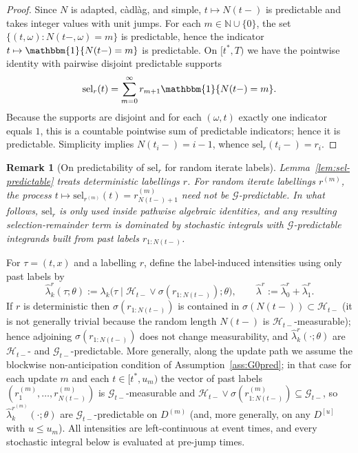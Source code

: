 \documentclass{statsoc}
\newtheorem{remark}[remark]{Remark}
\newcommand{\1}{\mathbbm{1}}
\newcommand{\bbN}{\mathbb{N}}
\begin{document}
\begin{proof}
Since $N$ is adapted, c\`adl\`ag, and simple, $t\mapsto N(t-)$ is predictable and takes integer values with unit jumps. For each $m\in\bbN\cup\{0\}$, the set $\{(t,\omega):N(t-,\omega)=m\}$ is predictable, hence the indicator $t\mapsto \1\{N(t-)=m\}$ is predictable. On $[t^\ast,T)$ we have the pointwise identity with pairwise disjoint predictable supports
\[
\mathrm{sel}_r(t)=\sum_{m=0}^\infty r_{m+1} \1\{N(t-)=m\}.
\]
Because the supports are disjoint and for each $(\omega,t)$ exactly one indicator equals $1$, this is a countable pointwise sum of predictable indicators; hence it is predictable. Simplicity implies $N(t_i-)=i-1$, whence $\mathrm{sel}_r(t_i-)=r_i$.
\end{proof}

\begin{remark}[On predictability of $\mathrm{sel}_r$ for random iterate labels]\label{rem:sel-random}
Lemma~\ref{lem:sel-predictable} treats deterministic labellings $r$. For random iterate labellings $r^{(m)}$, the process $t\mapsto \mathrm{sel}_{r^{(m)}}(t)=r^{(m)}_{N(t-)+1}$ need not be $\mathcal G$-predictable. In what follows, $\mathrm{sel}_r$ is only used inside pathwise algebraic identities, and any resulting selection-remainder term is dominated by stochastic integrals with $\mathcal G$-predictable integrands built from past labels $r_{1:N(t-)}$.
\end{remark}

For $\tau=(t,x)$ and a labelling $r$, define the label-induced intensities using only past labels by
\[
\widehat\lambda_k^r(\tau;\theta):=\lambda_k\!\big(\tau\mid \mathcal H_{t-}\vee\sigma(r_{1:N(t-)});\theta\big),\qquad
\widehat\lambda^r:=\widehat\lambda_0^r+\widehat\lambda_1^r.
\]
If $r$ is deterministic then $\sigma(r_{1:N(t-)})$ is contained in $\sigma(N(t-))\subset \mathcal H_{t-}$ (it is not generally trivial because the random length $N(t-)$ is $\mathcal H_{t-}$-measurable); hence adjoining $\sigma(r_{1:N(t-)})$ does not change measurability, and $\widehat\lambda_k^r(\cdot;\theta)$ are $\mathcal H_{t-}$- and $\mathcal G_{t-}$-predictable. More generally, along the update path we assume the blockwise non-anticipation condition of Assumption~\ref{ass:G0pred}; in that case for each update $m$ and each $t\in[t^\ast,u_m)$ the vector of past labels $(r^{(m)}_1,\ldots,r^{(m)}_{N(t-)})$ is $\mathcal G_{t-}$-measurable and $\mathcal H_{t-}\vee\sigma(r^{(m)}_{1:N(t-)})\subseteq\mathcal G_{t-}$, so $\widehat\lambda_k^{r^{(m)}}(\cdot;\theta)$ are $\mathcal G_{t-}$-predictable on $D^{(m)}$ (and, more generally, on any $D^{[u]}$ with $u\le u_m$).
All intensities are left-continuous at event times, and every stochastic integral below is evaluated at pre-jump times.
\end{document}
